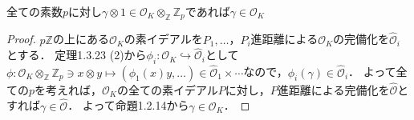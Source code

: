 \begin{screen}
  全ての素数$p$に対し$\gamma \otimes 1\in\mathcal{O}_K\otimes_\mathbb{Z}\mathbb{Z}_p$であれば$\gamma\in\mathcal{O}_K$
\end{screen}
\begin{proof}
  $p\mathbb{Z}$の上にある$\mathcal{O}_K$の素イデアルを$P_1, \ldots$，$P_i$進距離による$\mathcal{O}_K$の完備化を$\widehat{\mathcal{O}}_i$とする．
  定理1.3.23 (2)から$\phi_i\colon\mathcal{O}_K\hookrightarrow\widehat{\mathcal{O}}_i$として$\phi\colon\mathcal{O}_K\otimes_\mathbb{Z}\mathbb{Z}_p\ni x\otimes y\mapsto(\phi_1(x)y, \ldots)\in\widehat{\mathcal{O}}_1\times\cdots$なので，$\phi_i(\gamma)\in\widehat{\mathcal{O}}_i$．
  よって全ての$p$を考えれば，$\mathcal{O}_K$の全ての素イデアル$P$に対し，$P$進距離による完備化を$\widehat{\mathcal{O}}$とすれば$\gamma \in \widehat{\mathcal{O}}$．
  よって命題1.2.14から$\gamma\in\mathcal{O}_K$．
\end{proof}

